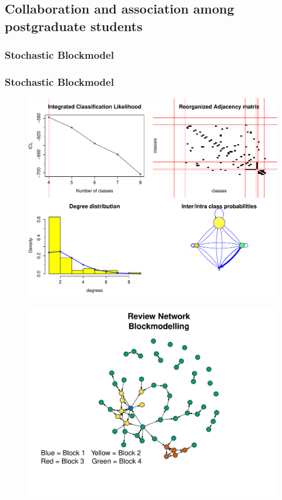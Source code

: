 \documentclass[compress]{beamer}
\begin{document}
\subsection{Collaboration and association among postgraduate students}
\subsubsection{Stochastic Blockmodel}
\begin{frame}
	\frametitle{Stochastic Blockmodel}
	\begin{figure}[ht]
		\centering
		\includegraphics[scale=.4]{block_out.pdf}
	\end{figure}
\end{frame}

\begin{frame}
	\begin{figure}[h]
		\centering
		\includegraphics[scale=.6]{net_block.pdf}
	\end{figure}
\end{frame}
\end{document}
